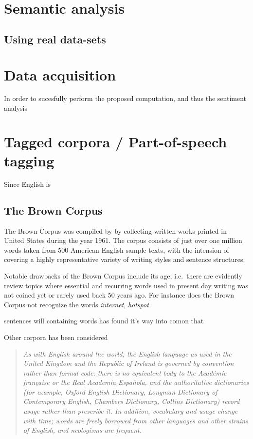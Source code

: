 \clearpage

\section{Semantic analysis}



\subsection{Using real data-sets}

\clearpage

\clearpage

\section{Data acquisition}
In order to sucesfully perform the proposed computation, and thus the sentiment analysis 

\section{Tagged corpora / Part-of-speech tagging}

Since English is 

\subsection{The Brown Corpus}
The Brown Corpus was compiled by \citeauthor{brown}  by collecting written works printed in United States during the year 1961. The corpus consists of just over one million words taken from 500 American English sample texts, with the intension of covering a highly representative variety of writing styles and sentence structures.

Notable drawbacks of the Brown Corpus include its age, i.e.\ there are evidently review topics where essential and recurring words used in present day writing was not coined yet or rarely used back 50 years ago. For instance does the Brown Corpus not recognize the words \emph{internet}, \emph{hotspot}

   sentences will containing words has found it's way into comon  that 

Other corpora has been considered

\begin{quote}
  \it As with English around the world, the English language as used in the United Kingdom and the Republic of Ireland is governed by convention rather than formal code: there is no equivalent body to the Académie française or the Real Academia Española, and the authoritative dictionaries (for example, Oxford English Dictionary, Longman Dictionary of Contemporary English, Chambers Dictionary, Collins Dictionary) record usage rather than prescribe it. In addition, vocabulary and usage change with time; words are freely borrowed from other languages and other strains of English, and neologisms are frequent.
\end{quote}
 
